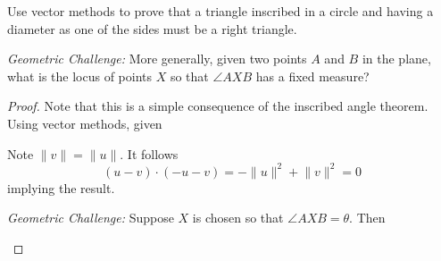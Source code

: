 \begin{exercise} \label{e1.2.14}
    Use vector methods to prove that a triangle inscribed in a circle and having a diameter as one of the sides must be a right triangle.
    
    \vspace{1cm}
    
    \emph{Geometric Challenge:} More generally, given two points \( A \) and \( B \) in the plane, what is the locus of points \( X \) so that \( \angle AXB \) has a fixed measure?
    
    \begin{proof}
        Note that this is a simple consequence of the inscribed angle theorem. Using vector methods, given
        
        \begin{center}
        \end{center}
        
        \noindent Note \( \lVert v \rVert = \lVert u \rVert \). It follows 
        \[ (u-v) \cdot (-u-v) = -\lVert u \rVert^2 + \lVert v \rVert^2 = 0\]
        implying the result.
        
        \vspace{1cm}
        
        \emph{Geometric Challenge:} Suppose \( X \) is chosen so that \( \angle AXB = \theta \). Then
        \begin{center}
\end{center}
\end{proof}
\end{exercise}
